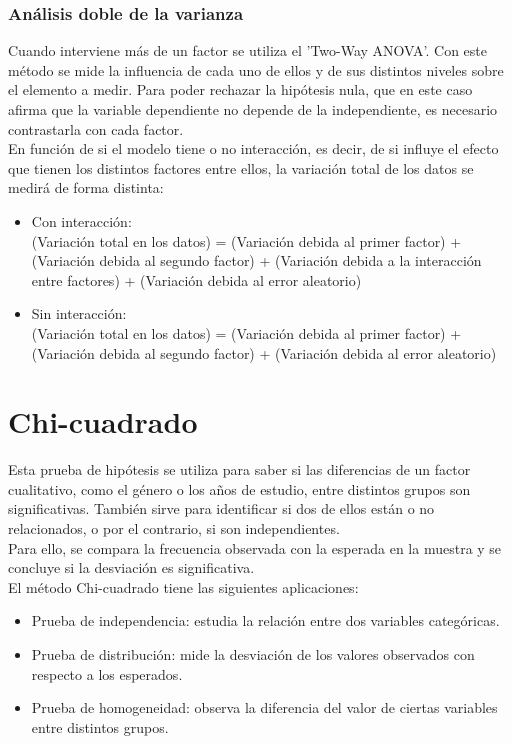 \subsubsection{Análisis doble de la varianza}
Cuando interviene más de un factor se utiliza el 'Two-Way ANOVA'. Con este método se mide la influencia de cada uno de ellos y de sus distintos niveles sobre el elemento a medir. Para poder rechazar la hipótesis nula, que en este caso afirma que la variable dependiente no depende de la independiente, es necesario contrastarla con cada factor.\\	


En función de si el modelo tiene o no interacción, es decir, de si influye el efecto que tienen los distintos factores entre ellos, la variación total de los datos se medirá de forma distinta:

\begin{itemize}
	\item Con interacción:\\
	(Variación total en los datos) = (Variación debida al primer factor) + (Variación debida al
	segundo factor) + (Variación debida a la interacción entre factores) + (Variación debida al
	error aleatorio) 
	\item Sin interacción:\\
	(Variación total en los datos) = (Variación debida al primer factor) + (Variación debida al
	segundo factor) + (Variación debida al error aleatorio) 
\end{itemize}

\section{Chi-cuadrado}
Esta prueba de hipótesis se utiliza para saber si las diferencias de un factor cualitativo, como el género o los años de estudio, entre distintos grupos son significativas. También sirve para identificar si dos de ellos están o no relacionados, o por el contrario, si son independientes.\\

Para ello, se compara la frecuencia observada con la esperada en la muestra y se concluye si la desviación es significativa.\\

El método Chi-cuadrado tiene las siguientes aplicaciones:
\begin{itemize}
	\item Prueba de independencia: estudia la relación entre dos variables categóricas.
	\item Prueba de distribución: mide la desviación de los valores observados con respecto a los esperados.
	\item Prueba de homogeneidad: observa la diferencia del valor de ciertas variables entre distintos grupos.
\end{itemize}

